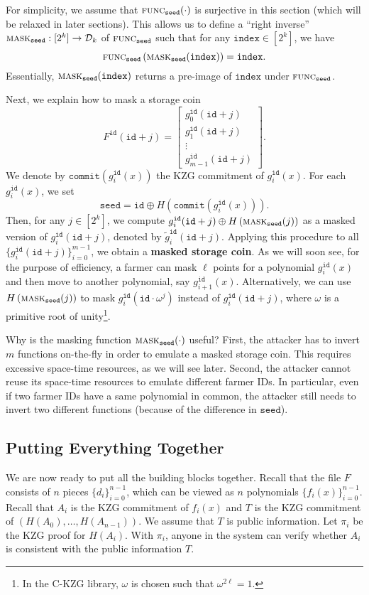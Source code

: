 \documentclass[conference]{IEEEtran}
\newcommand{\id}{\texttt{id}}
\newcommand{\seed}{\texttt{seed}}
\newcommand{\ind}{\texttt{index}}
\newcommand{\cmt}{\texttt{commit}}
\newcommand{\mask}{\textsc{mask}}
\newcommand{\func}{\textsc{func}}
\begin{document}
For simplicity, we assume that $\func_{\seed}(\cdot)$ is surjective in this section (which will be relaxed in later sections). This allows us to define a ``right inverse'' $\mask_{\seed}: [2^k] \to \mathcal{D}_k$ of $\func_{\seed}$ such that for any $\ind \in [2^k]$, we have
\[
\func_{\seed}\left( \mask_{\seed}(\ind) \right) = \ind. 
\]
Essentially, $\mask_{\seed}(\ind)$ returns a pre-image of $\ind$ under $\func_{\seed}$.


Next, we explain how to mask a storage coin
\[
F^{\id}(\id + j) = \begin{bmatrix} g_0^{\id}(\id + j)\\ g_1^{\id}(\id + j)\\  \vdots \\ g_{m-1}^{\id}(\id + j) \end{bmatrix}.
\]
We denote by $\cmt\left(g_i^{\id}(x)\right)$ the KZG commitment of $g_i^{\id}(x)$.
For each $g_i^{\id}(x)$, we set
\[
\seed = \id \oplus H\left( \cmt\left(g_i^{\id}(x)\right) \right).
\]
Then, for any $j \in [2^k]$, we compute $g_i^{\id}(\id + j) \oplus H\left( \mask_{\seed}(j) \right)$ as a masked version of $g_i^{\id}(\id + j)$, denoted by $\tilde{g}_i^{\id}(\id + j)$.
Applying this procedure to all $\{ g_i^{\id}(\id + j) \}_{i = 0}^{m - 1}$, we obtain a {\bf masked storage coin}.
As we will soon see, for the purpose of efficiency, a farmer can mask $\ell$ points for a polynomial $g_i^{\id}(x)$ and then move to another polynomial, say $g_{i+1}^{\id}(x)$.
Alternatively,
we can use $H\left( \mask_{\seed}(j) \right)$ to mask $g_i^{\id}(\id \cdot \omega^j)$ instead of $g_i^{\id}(\id + j)$, where $\omega$ is a primitive root of unity\footnote{In the C-KZG library, $\omega$ is chosen such that $\omega^{2 \ell} = 1$.}.

Why is the masking function $\mask_{\seed}(\cdot)$ useful? First, the attacker has to invert $m$ functions on-the-fly in order to emulate a masked  storage coin. This requires excessive space-time resources, as we will see later.
Second, the attacker cannot reuse its space-time resources to emulate different farmer IDs. In particular, even if two farmer IDs have a same polynomial in common, the attacker still needs to invert two different functions (because of the difference in $\seed$). 


\subsection{Putting Everything Together}

We are now ready to put all the building blocks together. Recall that the file $F$ consists of $n$ pieces $\{d_i\}_{i = 0}^{n-1}$, which can be viewed as $n$ polynomials $\{ f_i(x) \}_{i = 0}^{n-1}$. Recall that
$A_i$ is the KZG commitment of $f_i(x)$ and $T$ is the KZG commitment of $(H(A_0), \ldots, H(A_{n-1}))$. We assume that $T$ is public information.
Let $\pi_i$ be the KZG proof for $H(A_i)$. With $\pi_i$, anyone in the system can verify whether $A_i$ is consistent with the public information $T$.
\end{document}
